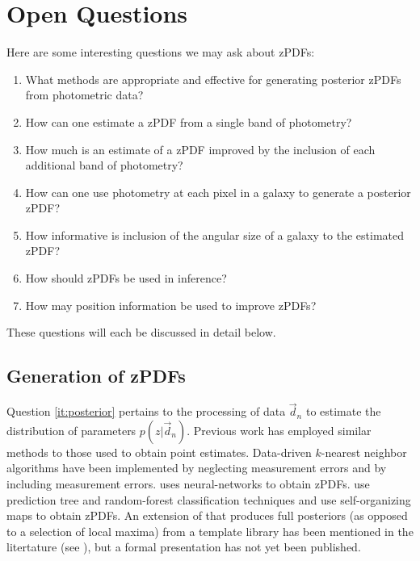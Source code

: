 \documentclass[12pt, onecolumn]{emulateapj}
\begin{document}
\section{Open Questions}

Here are some interesting questions we may ask about zPDFs:

\begin{enumerate}
\item \label{it:posterior} What methods are appropriate and effective for generating posterior zPDFs from photometric data?
\item \label{it:single} How can one estimate a zPDF from a single band of photometry?
\item \label{it:plus} How much is an estimate of a zPDF improved by the inclusion of each additional band of photometry? 
\item \label{it:pixel} How can one use photometry at each pixel in a galaxy to generate a posterior zPDF?
\item \label{it:spatial} How informative is inclusion of the angular size of a galaxy to the estimated zPDF?
\item \label{it:inference} How should zPDFs be used in inference?
\item \label{it:croscor} How may position information be used to improve zPDFs?
\end{enumerate}

These questions will each be discussed in detail below.

\subsection{Generation of zPDFs}

Question \ref{it:posterior} pertains to the processing of data $\vec{d}_{n}$ to estimate the distribution of parameters $p(z|\vec{d}_{n})$.  Previous work has employed similar methods to those used to obtain point estimates. Data-driven $k$-nearest neighbor algorithms have been implemented by \citet{she11} neglecting measurement errors and by \citet{bal08} including measurement errors.  \citet{bon13} uses neural-networks to obtain zPDFs.  \citet{car13} use prediction tree and random-forest classification techniques and \citet{car14} use self-organizing maps  to obtain zPDFs.  An extension of \citet{ben00} that produces full posteriors (as opposed to a selection of local maxima) from a template library has been mentioned in the litertature (see \citet{lop14}), but a formal presentation has not yet been published.
\end{document}
